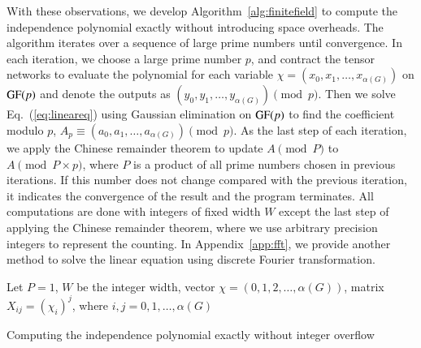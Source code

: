 \documentclass[onefignum, onetabnum]{siamart190516}
\newcommand{\<}{\langle}
\renewcommand{\>}{\rangle}
\newcommand{\Eq}[1]{Eq.~(\ref{#1})}
\newcommand{\App}[1]{Appendix~\ref{#1}}
\begin{document}
With these observations, we develop Algorithm~\ref{alg:finitefield} to compute the independence polynomial exactly without introducing space overheads.
The algorithm iterates over a sequence of large prime numbers until convergence.
In each iteration, we choose a large prime number $p$, and contract the tensor networks to evaluate the polynomial for each variable $\chi = (x_{0}, x_{1}, \ldots, x_{\alpha(G)})$ on ${\rm GF}(p)$ and denote the outputs as $(y_0, y_1, \ldots, y_{\alpha(G)}) \pmod p$.
Then we solve \Eq{eq:lineareq} using Gaussian elimination on ${\rm GF}(p)$ to find the coefficient modulo $p$, $A_p \equiv (a_0, a_1, \ldots, a_{\alpha(G)})\pmod p$.
As the last step of each iteration, we apply the Chinese remainder theorem to update $A \pmod P $ to $ A \pmod {P\times p}$, where $P$ is a product of all prime numbers chosen in previous iterations.
If this number does not change compared with the previous iteration, it indicates the convergence of the result and the program terminates.
All computations are done with integers of fixed width $W$ except the last step of applying the Chinese remainder theorem, where we use arbitrary precision integers to represent the counting.
In \App{app:fft}, we provide another method to solve the linear equation using discrete Fourier transformation.

\LinesNumberedHidden
\begin{algorithm}[!ht]
    \small
    \SetAlgoNoLine
    Let $P = 1$, $W$ be the integer width, vector $\chi = (0,1,2, \ldots, \alpha(G))$, matrix $X_{ij} = (\chi_i)^j$, where $i,j = 0, 1, \ldots, \alpha(G)$\;

    \caption{Computing the independence polynomial exactly without integer overflow}\label{alg:finitefield} 
\end{algorithm}
\end{document}
